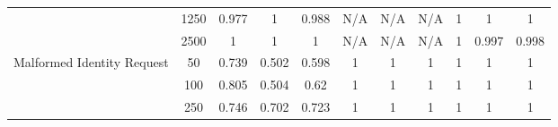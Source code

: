 \begin{table*}[]
{\begin{tabular}{ccccccccccc}
			\multicolumn{1}{|c|}{}                                            & \multicolumn{1}{c|}{1250}          & \multicolumn{1}{c|}{0.977}                   & \multicolumn{1}{c|}{1}                    & \multicolumn{1}{c|}{0.988}            & \multicolumn{1}{c|}{N/A}                        & \multicolumn{1}{c|}{N/A}                     & \multicolumn{1}{c|}{N/A}                 & \multicolumn{1}{c|}{1}                      & \multicolumn{1}{c|}{1}                   & \multicolumn{1}{c|}{1}               \\ \cline{2-11}
			\multicolumn{1}{|c|}{}                                            & \multicolumn{1}{c|}{2500}          & \multicolumn{1}{c|}{1}                       & \multicolumn{1}{c|}{1}                    & \multicolumn{1}{c|}{1}                & \multicolumn{1}{c|}{N/A}                        & \multicolumn{1}{c|}{N/A}                     & \multicolumn{1}{c|}{N/A}                 & \multicolumn{1}{c|}{1}                      & \multicolumn{1}{c|}{0.997}               & \multicolumn{1}{c|}{0.998}           \\ \hline
			\multicolumn{1}{|c|}{\multirow{6}{*}{Malformed Identity Request}} & \multicolumn{1}{c|}{50}            & \multicolumn{1}{c|}{0.739}                   & \multicolumn{1}{c|}{0.502}                & \multicolumn{1}{c|}{0.598}            & \multicolumn{1}{c|}{1}                      & \multicolumn{1}{c|}{1}                   & \multicolumn{1}{c|}{1}               & \multicolumn{1}{c|}{1}                      & \multicolumn{1}{c|}{1}                   & \multicolumn{1}{c|}{1}               \\ \cline{2-11}
			\multicolumn{1}{|c|}{}                                            & \multicolumn{1}{c|}{100}           & \multicolumn{1}{c|}{0.805}                   & \multicolumn{1}{c|}{0.504}                & \multicolumn{1}{c|}{0.62}             & \multicolumn{1}{c|}{1}                        & \multicolumn{1}{c|}{1}                     & \multicolumn{1}{c|}{1}                 & \multicolumn{1}{c|}{1}                      & \multicolumn{1}{c|}{1}                   & \multicolumn{1}{c|}{1}               \\ \cline{2-11}
			\multicolumn{1}{|c|}{}                                            & \multicolumn{1}{c|}{250}           & \multicolumn{1}{c|}{0.746}                   & \multicolumn{1}{c|}{0.702}                & \multicolumn{1}{c|}{0.723}            & \multicolumn{1}{c|}{1}                        & \multicolumn{1}{c|}{1}                     & \multicolumn{1}{c|}{1}                 & \multicolumn{1}{c|}{1}                      & \multicolumn{1}{c|}{1}                   & \multicolumn{1}{c|}{1}               \\ \cline{2-11}

\end{tabular}}
\end{table*}
